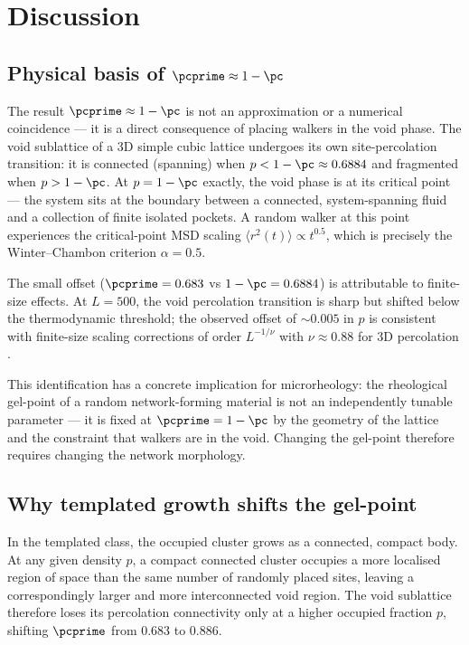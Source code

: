 \section{Discussion}
\label{sec:discussion}

\subsection{Physical basis of $\pcprime \approx 1 - \pc$}

The result $\pcprime \approx 1 - \pc$ is not an approximation or a numerical coincidence — it is a direct consequence of placing walkers in the void phase. The void sublattice of a 3D simple cubic lattice undergoes its own site-percolation transition: it is connected (spanning) when $p < 1 - \pc \approx 0.6884$ and fragmented when $p > 1 - \pc$. At $p = 1 - \pc$ exactly, the void phase is at its critical point — the system sits at the boundary between a connected, system-spanning fluid and a collection of finite isolated pockets. A random walker at this point experiences the critical-point MSD scaling $\langle r^2(t) \rangle \propto t^{0.5}$, which is precisely the Winter--Chambon criterion $\alpha = 0.5$.

The small offset ($\pcprime = 0.683$ vs $1 - \pc = 0.6884$) is attributable to finite-size effects. At $L = 500$, the void percolation transition is sharp but shifted below the thermodynamic threshold; the observed offset of $\sim 0.005$ in $p$ is consistent with finite-size scaling corrections of order $L^{-1/\nu}$ with $\nu \approx 0.88$ for 3D percolation \citep{Ballesteros1999}.

This identification has a concrete implication for microrheology: the rheological gel-point of a random network-forming material is not an independently tunable parameter — it is fixed at $\pcprime = 1 - \pc$ by the geometry of the lattice and the constraint that walkers are in the void. Changing the gel-point therefore requires changing the network morphology.

\subsection{Why templated growth shifts the gel-point}

In the templated class, the occupied cluster grows as a connected, compact body. At any given density $p$, a compact connected cluster occupies a more localised region of space than the same number of randomly placed sites, leaving a correspondingly larger and more interconnected void region. The void sublattice therefore loses its percolation connectivity only at a higher occupied fraction $p$, shifting $\pcprime$ from 0.683 to 0.886.


